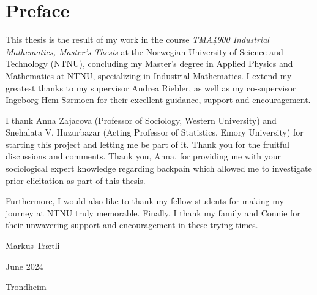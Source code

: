 \section*{Preface}
This thesis is the result of my work in the course \textit{TMA4900 Industrial
Mathematics, Master’s Thesis} at the Norwegian University of Science and
Technology (NTNU), concluding my Master’s degree in Applied Physics and Mathematics at NTNU, specializing in Industrial Mathematics. I extend my greatest thanks to my supervisor Andrea Riebler, as well as my co-supervisor Ingeborg Hem Sørmoen for their excellent guidance, support and encouragement. 

I thank Anna Zajacova (Professor of Sociology, Western University) and Snehalata V. Huzurbazar (Acting Professor of Statistics, Emory University) for starting this project and letting me be part of it. Thank you for the fruitful discussions and comments. Thank you, Anna, for providing me with your sociological expert knowledge regarding backpain which allowed me to investigate prior elicitation as part of this thesis. 

Furthermore, I would also like to thank my fellow students for making my journey at NTNU truly memorable. Finally, I thank my family and Connie for their unwavering support and encouragement in these trying times.

\vspace{1cm}
\begin{flushleft}
    Markus Trætli\par
    June 2024\par
    Trondheim
\end{flushleft}
